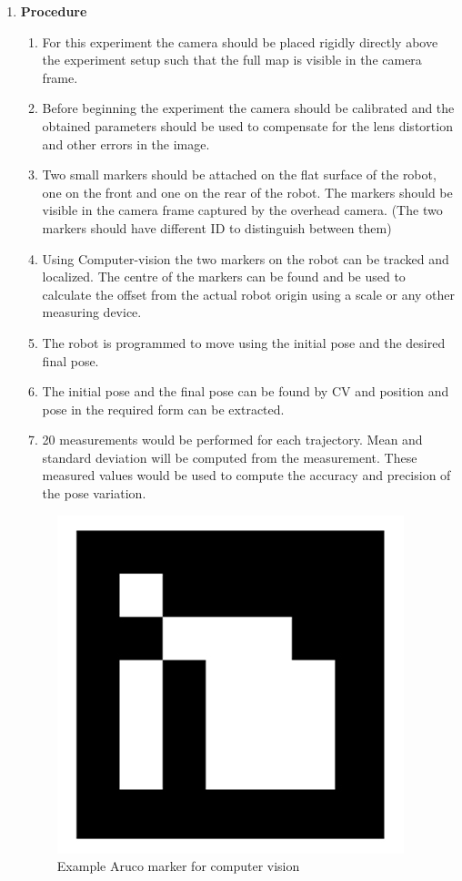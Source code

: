 \documentclass[10pt,a4paper]{article}
\begin{document}
\begin{enumerate}[label=\Roman*]
\vspace{0.5cm}
\newpage
\item
\Large{\textbf{Procedure}}\\

\begin{enumerate}
	\item
	For this experiment the camera should be placed rigidly directly above the experiment setup such that the full map is visible in the camera frame. 
	\item
	Before beginning the experiment the camera should be calibrated and the obtained parameters should be used to compensate for the lens distortion and other errors in the image. 
	\item
	Two small markers should be attached on the flat surface of the robot, one on the front and one on the rear of the robot. The markers should be visible in the camera frame captured by the overhead camera. (The two markers should have different ID to distinguish between them)
	\item
    Using Computer-vision the two markers on the robot can be tracked and localized. The centre of the markers can be found and be used to calculate the offset from the actual robot origin using a scale or any other measuring device.
	\item
	The robot is programmed to move using the initial pose and the desired final pose.
	\item
	The initial pose and the final pose can be found by CV and position and pose in the required form can be extracted.
	\item
	20 measurements would be performed for each trajectory. Mean and standard deviation will be computed from the measurement. These measured values would be used to compute the accuracy and precision of the pose variation. 
\end{enumerate}
\vspace{0.5cm}

\begin{figure}[h]
	\centering
\includegraphics[width=0.2\linewidth ]{marker.png}
\caption{ Example Aruco marker for computer vision}
\end{figure}


\end{enumerate}
\end{document}
